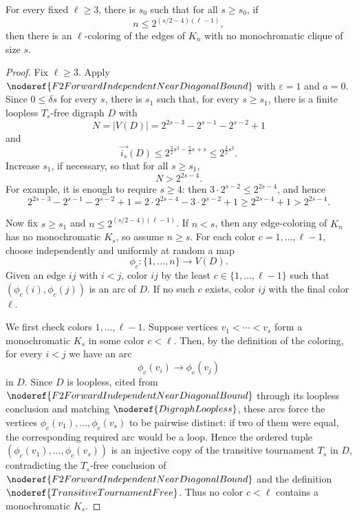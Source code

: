 \begin{lemma}
For every fixed \(\ell\ge 3\), there is \(s_0\) such that for all \(s\ge s_0\), if
\[
  n\le 2^{(s/2-4)(\ell-1)},
\]
then there is an \(\ell\)-coloring of the edges of \(K_n\) with no monochromatic clique of size \(s\).
\end{lemma}
\begin{proof}
Fix \(\ell\ge 3\). Apply \(\noderef{F2ForwardIndependentNearDiagonalBound}\) with \(\varepsilon=1\) and \(a=0\). Since \(0\le \delta s\) for every \(s\), there is \(s_1\) such that, for every \(s\ge s_1\), there is a finite loopless \(T_s\)-free digraph \(D\) with
\[
  N=|V(D)|=2^{2s-3}-2^{s-1}-2^{s-2}+1
\]
and
\[
  \overrightarrow{i_s}(D)\le
  2^{\frac32s^2-\frac52s+s}\le 2^{\frac32s^2}.
\]
Increase \(s_1\), if necessary, so that for all \(s\ge s_1\),
\[
  N>2^{2s-4}.
\]
For example, it is enough to require \(s\ge4\): then \(3\cdot 2^{s-2}\le 2^{2s-4}\), and hence
\[
  2^{2s-3}-2^{s-1}-2^{s-2}+1
  =2\cdot 2^{2s-4}-3\cdot 2^{s-2}+1
  \ge 2^{2s-4}+1
  >2^{2s-4}.
\]

Now fix \(s\ge s_1\) and \(n\le 2^{(s/2-4)(\ell-1)}\). If \(n<s\), then any edge-coloring of \(K_n\) has no monochromatic \(K_s\), so assume \(n\ge s\). For each color \(c=1,\ldots,\ell-1\), choose independently and uniformly at random a map
\[
  \phi_c:\{1,\ldots,n\}\to V(D).
\]
Given an edge \(ij\) with \(i<j\), color \(ij\) by the least \(c\in\{1,\ldots,\ell-1\}\) such that \((\phi_c(i),\phi_c(j))\) is an arc of \(D\). If no such \(c\) exists, color \(ij\) with the final color \(\ell\).

We first check colors \(1,\ldots,\ell-1\). Suppose vertices \(v_1<\cdots<v_s\) form a monochromatic \(K_s\) in some color \(c<\ell\). Then, by the definition of the coloring, for every \(i<j\) we have an arc
\[
  \phi_c(v_i)\to \phi_c(v_j)
\]
in \(D\). Since \(D\) is loopless, cited from \(\noderef{F2ForwardIndependentNearDiagonalBound}\) through its loopless conclusion and matching \(\noderef{DigraphLoopless}\), these arcs force the vertices \(\phi_c(v_1),\ldots,\phi_c(v_s)\) to be pairwise distinct: if two of them were equal, the corresponding required arc would be a loop. Hence the ordered tuple \((\phi_c(v_1),\ldots,\phi_c(v_s))\) is an injective copy of the transitive tournament \(T_s\) in \(D\), contradicting the \(T_s\)-free conclusion of \(\noderef{F2ForwardIndependentNearDiagonalBound}\) and the definition \(\noderef{TransitiveTournamentFree}\). Thus no color \(c<\ell\) contains a monochromatic \(K_s\).


\end{proof}

